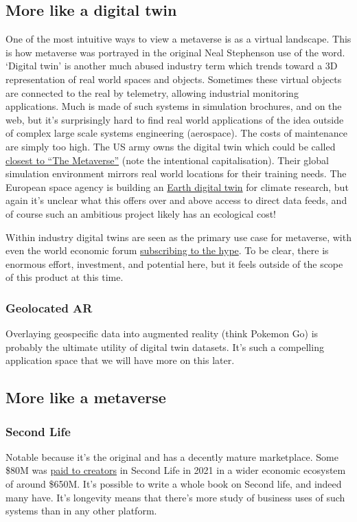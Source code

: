 \subsection{More like a digital twin}
One of the most intuitive ways to view a metaverse is as a virtual landscape. This is how metaverse was portrayed in the original Neal Stephenson use of the word. `Digital twin' is another much abused industry term which trends toward a 3D representation of real world spaces and objects. Sometimes these virtual objects are connected to the real by telemetry, allowing industrial monitoring applications. Much is made of such systems in simulation brochures, and on the web, but it's surprisingly hard to find real world applications of the idea outside of complex large scale systems engineering (aerospace). The costs of maintenance are simply too high. The US army owns the digital twin which could be called \href{https://www.army.mil/standto/archive/2018/03/26/}{closest to ``The Metaverse''} (note the intentional capitalisation). Their global simulation environment mirrors real world locations for their training needs. The European space agency is building an \href{}{Earth digital twin} for climate research, but again it's unclear what this offers over and above access to direct data feeds, and of course such an ambitious project likely has an ecological cost!\par
Within industry digital twins are seen as the primary use case for metaverse, with even the world economic forum \href{https://www.weforum.org/agenda/2023/01/metaverse-biggest-impact-industry-davos2023/}{subscribing to the hype}. To be clear, there is enormous effort, investment, and potential here, but it feels outside of the scope of this product at this time.
\subsubsection{Geolocated AR}
Overlaying geospecific data into augmented reality (think Pokemon Go) is probably the ultimate utility of digital twin datasets. It's such a compelling application space that we will have more on this later.
\subsection{More like a metaverse}
\subsubsection{Second Life}
Notable because it's the original and has a decently mature marketplace. Some \$80M was \href{https://www.zdnet.com/article/high-fidelity-invests-in-second-life-to-expand-virtual-world/}{paid to creators} in Second Life in 2021 in a wider economic ecosystem of around \$650M. It's possible to write a whole book on Second life, and indeed many have. It's longevity means that there's more study of business uses of such systems than in any other platform. 
